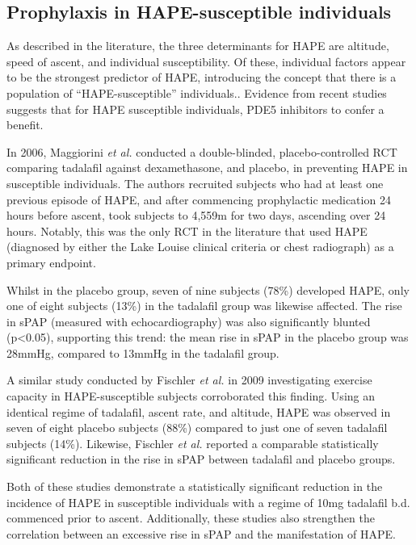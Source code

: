 \documentclass[10pt,a4paper]{article}
\begin{document}
\subsection*{Prophylaxis in HAPE-susceptible individuals}

As described in the literature, the three determinants for HAPE are altitude, speed of ascent, and individual susceptibility.\cite{Bartsch:2001kc,Bartsch:2002cg,Dehnert:2005ca} Of these, individual factors appear to be the strongest predictor of HAPE,\cite{Bartsch:2002cg} introducing the concept that there is a population of ``HAPE-susceptible'' individuals.\cite{Bartsch:2001kc,Dehnert:2005ca}. Evidence from recent studies suggests that for HAPE susceptible individuals, PDE5 inhibitors to confer a benefit.

In 2006, Maggiorini \emph{et al.} conducted a double-blinded, placebo-controlled RCT comparing tadalafil against dexamethasone, and placebo, in preventing HAPE in susceptible individuals.\cite{Maggiorini:2006kz} The authors recruited subjects who had at least one previous episode of HAPE, and after commencing prophylactic medication 24 hours before ascent, took subjects to 4,559m for two days, ascending over 24 hours. Notably, this was the only RCT in the literature that used HAPE (diagnosed by either the Lake Louise clinical criteria\cite{Sutton:1991wx} or chest radiograph) as a primary endpoint.

Whilst in the placebo group, seven of nine subjects (78\%) developed HAPE, only one of eight subjects (13\%) in the tadalafil group was likewise affected. The rise in sPAP (measured with echocardiography) was also significantly blunted (p<0.05), supporting this trend: the mean rise in sPAP in the placebo group was 28mmHg, compared to 13mmHg in the tadalafil group.\cite{Maggiorini:2006kz}

A similar study conducted by Fischler \emph{et al.} in 2009 investigating exercise capacity in HAPE-susceptible subjects corroborated this finding. Using an identical regime of tadalafil, ascent rate, and altitude, HAPE was observed in seven of eight placebo subjects (88\%) compared to just one of seven tadalafil subjects (14\%). Likewise, Fischler \emph{et al.} reported a comparable statistically significant reduction in the rise in sPAP between tadalafil and placebo groups.\cite{Fischler:2009ce}

Both of these studies demonstrate a statistically significant reduction in the incidence of HAPE in susceptible individuals with a regime of 10mg tadalafil b.d. commenced prior to ascent. Additionally, these studies also strengthen the correlation between an excessive rise in sPAP and the manifestation of HAPE.
\end{document}
